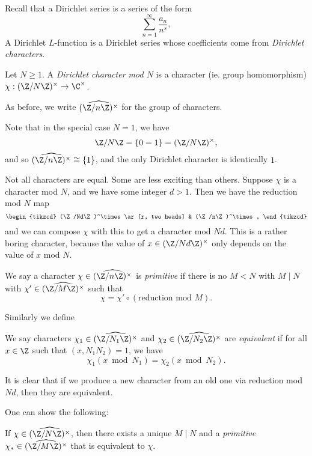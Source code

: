 \documentclass[a4paper]{article}
\begin{document}
Recall that a Dirichlet series is a series of the form
\[
  \sum_{n = 1}^\infty \frac{a_n}{n^s},
\]
A Dirichlet $L$-function is a Dirichlet series whose coefficients come from \emph{Dirichlet characters}.

\begin{defi}
  Let $N \geq 1$. A \emph{Dirichlet character mod $N$} is a character (ie. group homomorphism) $\chi: (\Z/N\Z)^\times \to \C^\times$.

  As before, we write $\widehat{(\Z/n\Z)^\times}$ for the group of characters.
\end{defi}
Note that in the special case $N = 1$, we have
\[
  \Z/N\Z = \{0 = 1\} = (\Z/N\Z)^\times,
\]
and so $\widehat{(\Z/n\Z)^\times} \cong \{1\}$, and the only Dirichlet character is identically $1$.

Not all characters are equal. Some are less exciting than others. Suppose $\chi$ is a character mod $N$, and we have some integer $d > 1$. Then we have the reduction mod $N$ map
\[
  \begin{tikzcd}
    (\Z/Nd\Z)^\times \ar[r, two heads] & (\Z/n\Z)^\times,
  \end{tikzcd}
\]
and we can compose $\chi$ with this to get a character mod $Nd$. This is a rather boring character, because the value of $x \in (\Z/Nd\Z)^\times$ only depends on the value of $x$ mod $N$.
\begin{defi}
  We say a character $\chi \in \widehat{(\Z/n\Z)^\times}$ is \emph{primitive} if there is no $M < N$ with $M \mid N$ with $\chi' \in \widehat{(\Z/M\Z)^\times}$ such that
  \[
    \chi = \chi' \circ (\text{reduction mod $M$}).
  \]
\end{defi}

Similarly we define
\begin{defi}
  We say characters $\chi_1 \in \widehat{(\Z/N_1\Z)^\times}$ and $\chi_2 \in \widehat{(\Z/N_2\Z)^\times}$ are \emph{equivalent} if for all $x \in \Z$ such that $(x, N_1 N_2) = 1$, we have
  \[
    \chi_1(x \bmod N_1) = \chi_2(x \bmod N_2).
  \]
\end{defi}
It is clear that if we produce a new character from an old one via reduction mod $Nd$, then they are equivalent.

One can show the following:
\begin{prop}
  If $\chi \in \widehat{(\Z/N\Z)^\times}$, then there exists a unique $M \mid N$ and a \emph{primitive} $\chi_* \in \widehat{(\Z/M\Z)^\times}$ that is equivalent to $\chi$.
\end{prop}
\end{document}
